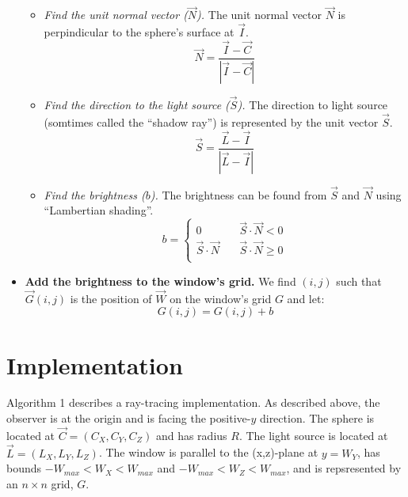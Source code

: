 \documentclass{article}
\begin{document}
\begin{itemize}
\begin{itemize}
      \item \textit{Find the unit normal vector ($\vec N$).} The unit normal
        vector $\vec N$ is perpindicular to the sphere's surface at $\vec I$.
        $$ \vec N = \frac{\vec I - \vec C}{\left| \vec I - \vec C \right|} $$

      \item \textit{Find the direction to the light source ($\vec S$).} The
        direction to light source (somtimes called the ``shadow ray'') is
        represented by the unit vector $\vec S$.
        $$ \vec S = \frac{\vec L - \vec I}{\left| \vec L - \vec I \right|} $$

      \item \textit{Find the brightness ($b$).} The brightness can be found
        from $\vec S$ and $\vec N$ using ``Lambertian shading''.
        $$
        b = \left\{
          \begin{array}{ll}
            0 & \quad  \vec S \cdot \vec N < 0 \\
            \vec S \cdot \vec N & \quad  \vec S \cdot \vec N \ge 0 \\
          \end{array}
          \right.
        $$

    \end{itemize}

  \item \textbf{Add the brightness to the window's grid.}
    We find $\left(i,j\right)$ such that $\vec G(i,j)$ is the position of $\vec
    W$ on the window's grid $G$ and let:
    $$ G(i,j) = G(i,j) + b $$

\end{itemize}

\newpage

\section{Implementation}

Algorithm 1 describes a ray-tracing implementation.  As described above, the
observer is at the origin and is facing the positive-$y$ direction.  The sphere
is located at $\vec C = (C_X, C_Y, C_Z)$ and has radius $R$. The light source
is located at $\vec L = (L_X, L_Y, L_Z)$.  The window is parallel to the
(x,z)-plane at $y=W_Y$, has bounds $-W_{max} < W_X < W_{max}$ and $-W_{max} <
W_Z < W_{max}$, and is repsresented by an $n \times n$ grid, $G$.
\end{document}
